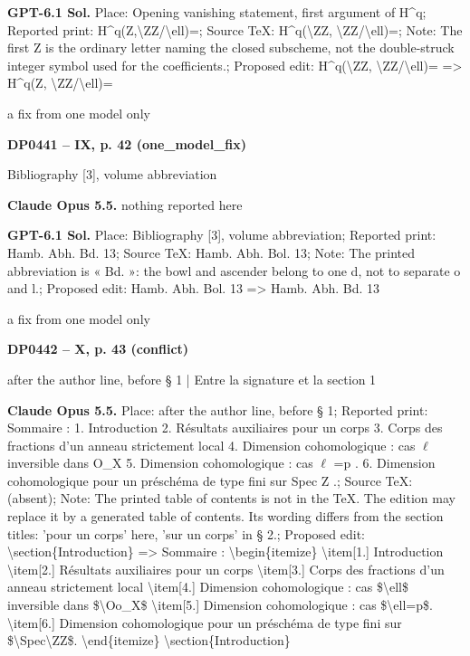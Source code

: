 \textbf{GPT-6.1 Sol.} Place: Opening vanishing statement, first argument of H\textasciicircum{}q; Reported print: H\textasciicircum{}q(Z,\textbackslash{}ZZ/\textbackslash{}ell)=; Source TeX: H\textasciicircum{}q(\textbackslash{}ZZ, \textbackslash{}ZZ/\textbackslash{}ell)=; Note: The first Z is the ordinary letter naming the closed subscheme, not the double-struck integer symbol used for the coefficients.; Proposed edit: H\textasciicircum{}q(\textbackslash{}ZZ, \textbackslash{}ZZ/\textbackslash{}ell)= =\allowbreak > H\textasciicircum{}q(Z, \textbackslash{}ZZ/\textbackslash{}ell)=\par
a fix from one model only\par
\par\noindent\hypertarget{DP0441}{}\textbf{DP0441 -- IX, p. 42 (one\_model\_fix)}\par
Bibliography [3], volume abbreviation\par
\textbf{Claude Opus 5.5.} nothing reported here\par
\textbf{GPT-6.1 Sol.} Place: Bibliography [3], volume abbreviation; Reported print: Hamb. Abh. Bd. 13; Source TeX: Hamb. Abh. Bol. 13; Note: The printed abbreviation is « Bd. »: the bowl and ascender belong to one d, not to separate o and l.; Proposed edit: Hamb. Abh. Bol. 13 =\allowbreak > Hamb. Abh. Bd. 13\par
a fix from one model only\par
\par\noindent\hypertarget{DP0442}{}\textbf{DP0442 -- X, p. 43 (conflict)}\par
after the author line, before § 1 | Entre la signature et la section 1\par
\textbf{Claude Opus 5.5.} Place: after the author line, before § 1; Reported print: Sommaire : 1. Introduction 2. Résultats auxiliaires pour un corps 3. Corps des fractions d'un anneau strictement local 4. Dimension cohomologique : cas \ensuremath{\ell} inversible dans O\_X 5. Dimension cohomologique : cas \ensuremath{\ell} =\allowbreak  p . 6. Dimension cohomologique pour un préschéma de type fini sur Spec Z .; Source TeX: (absent); Note: The printed table of contents is not in the TeX. The edition may replace it by a generated table of contents. Its wording differs from the section titles: 'pour un corps' here, 'sur un corps' in § 2.; Proposed edit: \textbackslash{}section\{Introduction\} =\allowbreak > Sommaire : \textbackslash{}begin\{itemize\} \textbackslash{}item[1.] Introduction \textbackslash{}item[2.] Résultats auxiliaires pour un corps \textbackslash{}item[3.] Corps des fractions d'un anneau strictement local \textbackslash{}item[4.] Dimension cohomologique : cas \$\textbackslash{}ell\$ inversible dans \$\textbackslash{}Oo\_X\$ \textbackslash{}item[5.] Dimension cohomologique : cas \$\textbackslash{}ell=\allowbreak p\$. \textbackslash{}item[6.] Dimension cohomologique pour un préschéma de type fini sur \$\textbackslash{}Spec\textbackslash{}ZZ\$. \textbackslash{}end\{itemize\}  \textbackslash{}section\{Introduction\}\par
